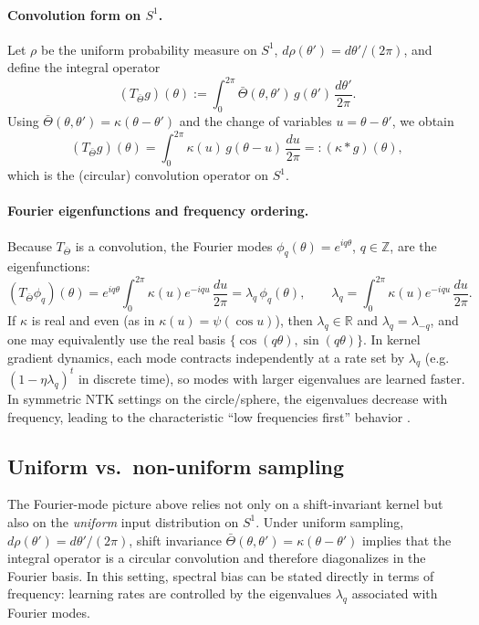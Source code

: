 \paragraph{Convolution form on $S^1$.}
Let $\rho$ be the uniform probability measure on $S^1$,
$d\rho(\theta')=d\theta'/(2\pi)$, and define the integral operator
\[
	(T_{\bar\Theta} g)(\theta)
	:=
	\int_0^{2\pi} \bar\Theta(\theta,\theta')\,g(\theta')\,\frac{d\theta'}{2\pi}.
\]
Using $\bar\Theta(\theta,\theta')=\kappa(\theta-\theta')$ and the change of
variables $u=\theta-\theta'$, we obtain
\[
	(T_{\bar\Theta} g)(\theta)
	=
	\int_0^{2\pi} \kappa(u)\,g(\theta-u)\,\frac{du}{2\pi}
	=: (\kappa * g)(\theta),
\]
which is the (circular) convolution operator on $S^1$.

\paragraph{Fourier eigenfunctions and frequency ordering.}
Because $T_{\bar\Theta}$ is a convolution, the Fourier modes
$\phi_q(\theta)=e^{iq\theta}$, $q\in\mathbb Z$, are the eigenfunctions:
\[
	(T_{\bar\Theta}\phi_q)(\theta)
	=
	e^{iq\theta}\int_0^{2\pi}\kappa(u)e^{-iqu}\,\frac{du}{2\pi}
	=
	\lambda_q\,\phi_q(\theta),
	\qquad
	\lambda_q
	=
	\int_0^{2\pi}\kappa(u)e^{-iqu}\,\frac{du}{2\pi}.
\]
If $\kappa$ is real and even (as in $\kappa(u)=\psi(\cos u)$), then
$\lambda_q\in\mathbb R$ and $\lambda_q=\lambda_{-q}$, and one may equivalently
use the real basis $\{\cos(q\theta),\sin(q\theta)\}$.
In kernel gradient dynamics, each mode contracts independently at a rate set by
$\lambda_q$ (e.g.\ $(1-\eta\lambda_q)^t$ in discrete time), so modes with larger
eigenvalues are learned faster. In symmetric NTK settings on the
circle/sphere, the eigenvalues decrease with frequency, leading to the
characteristic ``low frequencies first'' behavior
\citep{basri2020frequencybiasneuralnetworks,rahaman2019spectralbiasneuralnetworks}.

\subsection{Uniform vs.\ non-uniform sampling}\label{subsec:uniform-nonuniform}

The Fourier-mode picture above relies not only on a shift-invariant kernel but
also on the \emph{uniform} input distribution on $S^1$. Under uniform sampling,
$d\rho(\theta')=d\theta'/(2\pi)$, shift invariance $\bar\Theta(\theta,\theta')
	=\kappa(\theta-\theta')$ implies that the integral operator is a circular
convolution and therefore diagonalizes in the Fourier basis. In this setting,
spectral bias can be stated directly in terms of frequency: learning rates are
controlled by the eigenvalues $\lambda_q$ associated with Fourier modes.

